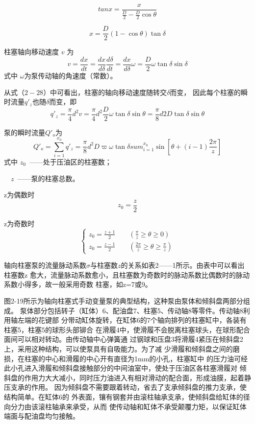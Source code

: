 \begin{equation*}
    tan x = \frac{x}{\frac{D}{2}-\frac{D}{2}\cos \theta }
\end{equation*}
    
    $$ x = \frac{D}{2}(1-\cos \theta )\tan \delta $$

    柱塞轴向移动速度 $v$ 为
\begin{equation}
    v = \frac{dx}{dt} = \frac{dx}{d\delta} \frac{d\delta}{dt}=\frac{dx}{d\delta}\omega=\frac{D}{2}\omega\tan\delta\sin\delta
\end{equation}
    式中 $\omega $为泵传动轴的角速度（常数）。

    从式（$2-28$）中可看出，柱塞的轴向移动速度随转交$\delta$而变，
因此每个柱塞的瞬时流量$q'_{z}$也随$\delta$而变，即
  $$q'_{z} =\frac{\pi }{4} d^2v=\frac{\pi }{4}d^2\frac{D}{2}\omega \tan \delta \sin \theta =\frac{\pi }{8}d2D\tan \delta \sin \theta$$
  
   泵的瞬时流量$Q'_{o}$为
\begin{equation}
    Q'_{o}=\sum_{i = 1}^{x_{0}} q'_{z} =\frac{\pi }{8}d^2D\varpi\omega \tan \delta 
    sum_{i = 1}^{x_{0}}\sin [\theta +(i-1)\frac{2\pi }{z}]
\end{equation}
   式中 \qquad$z_{0}$\ ——处于压油区的柱塞数；


\qquad \ \ $z$\ ——泵的柱塞总数。


z为偶数时
$$ z_{0}=\frac{z}{2}$$

z为奇数时
\begin{equation*}
    \begin{cases}
        z_{0}=\frac{z+1}{2}  \qquad    (\frac{\pi }{z}\geq \theta \geq 0) \\
        z_{0}=\frac{z-1}{2}  \qquad    (\frac{2\pi }{z}\geq \theta \geq \frac{\pi }{z})  
    \end{cases}
\end{equation*}

轴向柱塞泵的流量脉动系数$\sigma $与柱塞数$z$的关系如表2——1所示。由表中可以看出柱塞数z
愈大，流量脉动系数愈小，且柱塞数为奇数时的脉动系数比偶数时的脉动系数小得多，故一般采用奇数
柱塞，如z=7或9。

图2-19所示为轴向柱塞式手动变量泵的典型结构，这种泵由泵体和倾斜盘两部分组成。
泵体部分包括转子（缸体）6、配油盘7、柱塞5、传动轴8等零件。传动轴8利用轴左端的花键部
分带动缸体旋转，在缸体6的7个轴向排列的柱塞缸中，各装有柱塞5，柱塞5的球形头部铆合
在滑履4中，使滑履不会脱离柱塞球头，在球形配合面间可以相对转动。由传动轴中心弹簧通
过钢球和压盘3将滑履4紧压在倾斜盘2上，采用这种结构，可以使泵具有自吸能力。为了减
少滑履和倾斜盘之间的磨损，在柱塞的中心和滑履的中心开有直径为1mm的小孔，柱塞缸中
的压力油可经此小孔进入滑履和倾斜盘接触部分的中间油室中，使处于压油区各柱塞滑履对
倾斜盘的作用力大大减小，同时压力油进入有相对滑动的配合面，形成油膜，起着静压支承的作用。
因为倾斜盘不需要跟着转动，省去了支承倾斜盘的推力支承，使结构简单。在缸体6的
外表面，镶有钢套并由滚柱轴承支承，使倾斜盘给缸体的径向分力由该滚柱轴承来承受，从而
使传动轴和缸体不承受颠覆力矩，以保证缸体端面与配油盘均匀接触。

